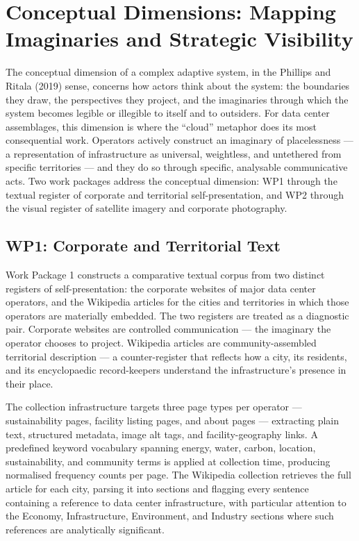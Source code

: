 \section{Conceptual Dimensions: Mapping Imaginaries and Strategic Visibility}
\label{sec:conceptual}

The conceptual dimension of a complex adaptive system, in the Phillips and Ritala (2019) sense, concerns how actors think about the system: the boundaries they draw, the perspectives they project, and the imaginaries through which the system becomes legible or illegible to itself and to outsiders. For data center assemblages, this dimension is where the ``cloud'' metaphor does its most consequential work. Operators actively construct an imaginary of placelessness — a representation of infrastructure as universal, weightless, and untethered from specific territories — and they do so through specific, analysable communicative acts. Two work packages address the conceptual dimension: WP1 through the textual register of corporate and territorial self-presentation, and WP2 through the visual register of satellite imagery and corporate photography.

\subsection{WP1: Corporate and Territorial Text}

Work Package 1 constructs a comparative textual corpus from two distinct registers of self-presentation: the corporate websites of major data center operators, and the Wikipedia articles for the cities and territories in which those operators are materially embedded. The two registers are treated as a diagnostic pair. Corporate websites are controlled communication — the imaginary the operator chooses to project. Wikipedia articles are community-assembled territorial description — a counter-register that reflects how a city, its residents, and its encyclopaedic record-keepers understand the infrastructure's presence in their place.

The collection infrastructure targets three page types per operator — sustainability pages, facility listing pages, and about pages — extracting plain text, structured metadata, image alt tags, and facility-geography links. A predefined keyword vocabulary spanning energy, water, carbon, location, sustainability, and community terms is applied at collection time, producing normalised frequency counts per page. The Wikipedia collection retrieves the full article for each city, parsing it into sections and flagging every sentence containing a reference to data center infrastructure, with particular attention to the Economy, Infrastructure, Environment, and Industry sections where such references are analytically significant.

